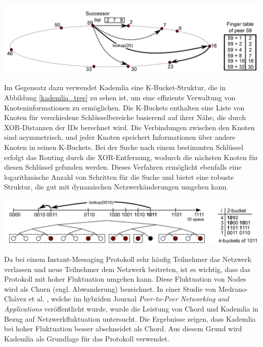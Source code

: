 \begin{center}
    \captionsetup{type=figure}
    \includegraphics[width=0.9\linewidth]{images/chord_ring.png}
    \label{chord_ring}
\end{center}

\noindent Im Gegensatz dazu verwendet Kademlia eine K-Bucket-Struktur, die in Abbildung \ref{kademlia_tree} zu sehen ist, um eine effiziente Verwaltung von Knoteninformationen zu ermöglichen. Die K-Buckets enthalten eine Liste von Knoten für verschiedene Schlüsselbereiche basierend auf ihrer Nähe, die durch XOR-Distanzen der IDs berechnet wird. Die Verbindungen zwischen den Knoten sind asymmetrisch, und jeder Knoten speichert Informationen über andere Knoten in seinen K-Buckets. Bei der Suche nach einem bestimmten Schlüssel erfolgt das Routing durch die XOR-Entfernung, wodurch die nächsten Knoten für diesen Schlüssel gefunden werden. Dieses Verfahren ermöglicht ebenfalls eine logarithmische Anzahl von Schritten für die Suche und bietet eine robuste Struktur, die gut mit dynamischen Netzwerkänderungen umgehen kann.

\begin{center}
    \captionsetup{type=figure}
    \includegraphics[width=0.9\linewidth]{images/kademlia_tree.png}
    \label{kademlia_tree}
\end{center}


\noindent Da bei einem Instant-Messaging Protokoll sehr häufig Teilnehmer das Netzwerk verlassen und neue Teilnehmer dem Netzwerk beitreten, ist es wichtig, dass das Protokoll mit hoher Fluktuation umgehen kann. Diese Fluktuation von Nodes wird als Churn (engl. Abwanderung) bezeichnet. In einer Studie von Medrano-Chávez et al. \parencite{MedranoChavez_ChordKademliaHighChurnScenarios}, welche im hybriden Journal \textit{Peer-to-Peer Networking and Applications} veröffentlicht wurde, wurde die Leistung von Chord und Kademlia in Bezug auf Netzwerkfluktuation untersucht. Die Ergebnisse zeigen, dass Kademlia bei hoher Fluktuation besser abschneidet als Chord. Aus diesem Grund wird Kademlia als Grundlage für das Protokoll verwendet.

